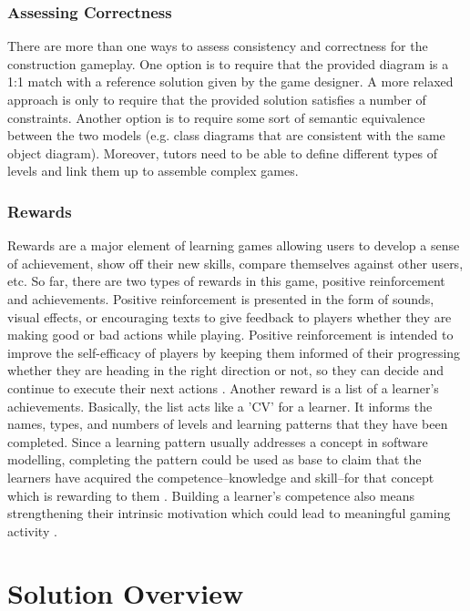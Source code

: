 \documentclass[conference]{IEEEtran}
\begin{document}
\subsubsection{Assessing Correctness} 
There are more than one ways to assess consistency and correctness for the construction gameplay. One option is to require that the provided diagram is a 1:1 match with a reference solution given by the game designer. A more relaxed approach is only to require that the provided solution satisfies a number of constraints. Another option is to require some sort of semantic equivalence between the two models (e.g. class diagrams that are consistent with the same object diagram). Moreover, tutors need to be able to define different types of levels and link them up to assemble complex games.

\subsubsection{Rewards}
Rewards are a major element of learning games allowing users to develop a sense of achievement, show off their new skills, compare themselves against other users, etc. So far, there are two types of rewards in this game, positive reinforcement and achievements. Positive reinforcement is presented in the form of sounds, visual effects, or encouraging texts to give feedback to players whether they are making good or bad actions while playing. Positive reinforcement is intended to improve the self-efficacy of players by keeping them informed of their progressing whether they are heading in the right direction or not, so they can decide and continue to execute their next actions \cite{richter2015studying}. Another reward is a list of a learner's achievements. Basically, the list acts like a 'CV' for a learner. It informs the names, types, and numbers of levels and learning patterns that they have been completed. Since a learning pattern usually addresses a concept in software modelling, completing the pattern could be used as base to claim that the learners have acquired the competence--knowledge and skill--for that concept which is rewarding to them \cite{richter2015studying}. Building a learner's competence also means strengthening their intrinsic motivation \cite{ryan2017self} which could lead to meaningful gaming activity \cite{nicholson2015recipe}.

\section{Solution Overview}
\label{Solution Overview}
\end{document}
